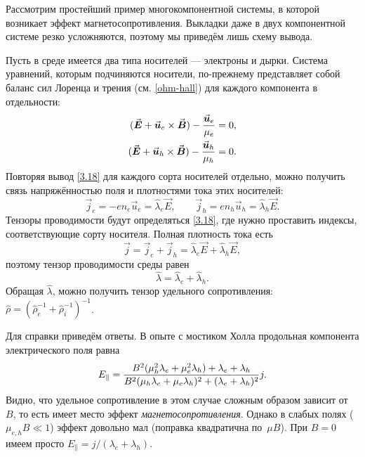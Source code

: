 \begin{lab:example}
Рассмотрим простейший пример многокомпонентной системы, в которой возникает
эффект магнетосопротивления. Выкладки даже в двух компонентной
системе резко усложняются, поэтому мы приведём лишь схему вывода.

Пусть в среде имеется два типа носителей --- электроны и дырки. Система
уравнений, которым подчиняются носители, по-прежнему представляет собой баланс
сил Лоренца и трения (см. \eqref{ohm-hall}) для каждого компонента в
отдельности:
\begin{equation}
    \eqmark{two-component}
    \begin{aligned}
(\vec{E}+\vec{u}_e\times \vec{B}) - \frac{\vec{u}_e}{\mu_e} &=0,\\
(\vec{E}+\vec{u}_h\times \vec{B}) - \frac{\vec{u}_h}{\mu_h} &=0.
\end{aligned}
\end{equation}
Повторяя вывод \eqref{3.18} для каждого сорта носителей отдельно, можно
получить связь напряжённостью поля и плотностями тока этих носителей:
\begin{equation}
    \vec{j}_e = -en_e \vec{u}_e = \hat{\lambda}_e \vec{E},\qquad
    \vec{j}_h = en_h \vec{u}_h = \hat{\lambda}_h \vec{E}.
\end{equation}
Тензоры проводимости будут определяться \eqref{3.18}, где нужно проставить
индексы, соответствующие сорту носителя.
Полная плотность тока есть
\[
\vec{j} = \vec{j}_e + \vec{j}_h = \hat{\lambda}_e \vec{E} +
\hat{\lambda}_h \vec{E},
\]
поэтому тензор проводимости среды равен
\[
\hat{\lambda} = \hat{\lambda}_e + \hat{\lambda}_h.
\]
Обращая $\hat{\lambda}$, можно получить тензор удельного сопротивления:
$\hat{\rho}=
\left(\hat{\rho}_e^{-1}+\hat{\rho}_i^{-1}\right)^{-1}$.

Для справки приведём ответы.
В опыте с мостиком Холла продольная компонента электрического поля равна
\begin{equation}
\eqmark{lambda_twocomponent}
E_{\parallel} = \frac{B^2 (\mu_h^2 \lambda_e + \mu_e^2 \lambda_h) + \lambda_e+
    \lambda_h}%
{ B^2 (\mu_h \lambda_e + \mu_e \lambda_h)^2 + (\lambda_e+\lambda_h)^2}
j.
\end{equation}
Видно, что удельное сопротивление в этом случае сложным образом
зависит от~$B$, то есть имеет место эффект \emph{магнетосопротивления}.
Однако в слабых полях ($\mu_{e,h}B \ll 1$) эффект довольно мал (поправка
квадратична по~$\mu B$). При $B=0$ имеем просто
$E_{\parallel} = j/(\lambda_e+\lambda_h)$.


\end{lab:example}
